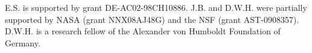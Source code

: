 \documentclass[12pt,preprint]{aastex}
\begin{document}

\acknowledgements E.S. is supported by grant DE-AC02-98CH10886.
J.B. and D.W.H. were partially supported by NASA
(grant NNX08AJ48G) and the NSF (grant AST-0908357). D.W.H. is a
research fellow of the Alexander von Humboldt Foundation of Germany.

\end{document}
